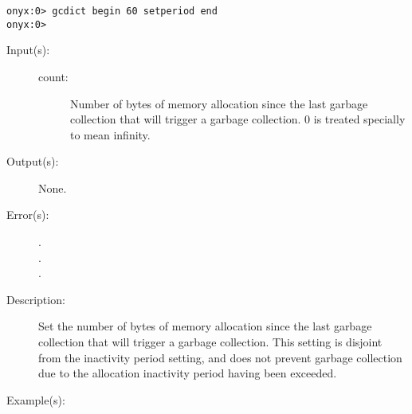 \begin{description}
\begin{description}
\begin{verbatim}
onyx:0> gcdict begin 60 setperiod end
onyx:0>
		\end{verbatim}
	\end{description}
\label{gcdict:setthreshold}
\item[{\onyxop{count}{setthreshold}{--}}: ]
	\begin{description}\item[]
	\item[Input(s): ]
		\begin{description}\item[]
		\item[count: ]
			Number of bytes of memory allocation since the last
			garbage collection that will trigger a garbage
			collection.  0 is treated specially to mean infinity.
		\end{description}
	\item[Output(s): ] None.
	\item[Error(s): ]
		\begin{description}\item[]
		\item[.]
		\item[.]
		\item[.]
		\end{description}
	\item[Description: ]
		Set the number of bytes of memory allocation since the last
		garbage collection that will trigger a garbage collection.  This
		setting is disjoint from the inactivity period setting, and does
		not prevent garbage collection due to the allocation inactivity
		period having been exceeded.
	\item[Example(s): ]\begin{verbatim}


\end{verbatim}
\end{description}
\end{description}
